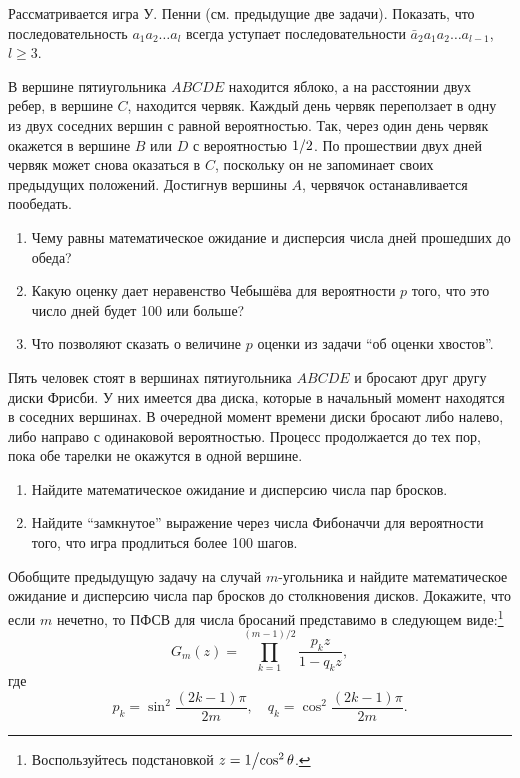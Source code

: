 \begin{problem}
Рассматривается игра У. Пенни (см. предыдущие две задачи). Показать, что 
последовательность $a_1 a_2 \ldots a_l $ всегда уступает последовательности 
$\bar {a}_2 a_1 a_2 \ldots a_{l-1} $, $l\ge 3$.
\end{problem}


\begin{problem}
В вершине пятиугольника $ABCDE$ 
находится яблоко, а на расстоянии двух ребер, в вершине $C$, находится 
червяк. Каждый день червяк переползает в одну из двух соседних вершин с 
равной вероятностью. Так, через один день червяк окажется в вершине $B$ или 
$D$ с вероятностью $1 \mathord{\left/ {\vphantom {1 2}} \right. 
\kern-\nulldelimiterspace} 2$. По прошествии двух дней червяк может снова 
оказаться в $C$, поскольку он не запоминает своих предыдущих положений. 
Достигнув вершины $A$, червячок останавливается пообедать.

\begin{enumerate}
\item Чему равны математическое ожидание и дисперсия числа дней прошедших до обеда?
\item Какую оценку дает неравенство Чебышёва для вероятности $p$ того, что это число дней будет 100 или больше?
\item Что позволяют сказать о величине $p$ оценки из задачи ``об оценки хвостов''.
\end{enumerate}
\end{problem}


\begin{problem}
Пять человек стоят в вершинах пятиугольника $ABCDE$ и 
бросают друг другу диски Фрисби. У них имеется два диска, которые в 
начальный момент находятся в соседних вершинах. В очередной момент времени 
диски бросают либо налево, либо направо с одинаковой вероятностью. Процесс 
продолжается до тех пор, пока обе тарелки не окажутся в одной вершине.

\begin{enumerate}
\item Найдите математическое ожидание и дисперсию числа пар бросков.
\item Найдите ``замкнутое'' выражение через числа Фибоначчи для вероятности того, что игра продлиться более 100 шагов.
\end{enumerate}
\end{problem}


\begin{problem}
Обобщите предыдущую задачу на случай $m$-угольника и найдите 
математическое ожидание и дисперсию числа пар бросков до столкновения 
дисков. Докажите, что если $m$ нечетно, то ПФСВ для числа бросаний 
представимо в следующем виде:\footnote{ Воспользуйтесь подстановкой $z=1 
\mathord{\left/ {\vphantom {1 {\cos ^2\theta }}} \right. 
\kern-\nulldelimiterspace} {\cos ^2\theta }$.}
\[
G_m (z)=\prod\limits_{k=1}^{(m-1)/2} {\frac{p_k z}{1-q_k z}} ,
\]
где
\[
p_k =\sin ^2\frac{(2k-1)\pi }{2m},
\quad
q_k =\cos ^2\frac{(2k-1)\pi }{2m}.
\]
\end{problem}



